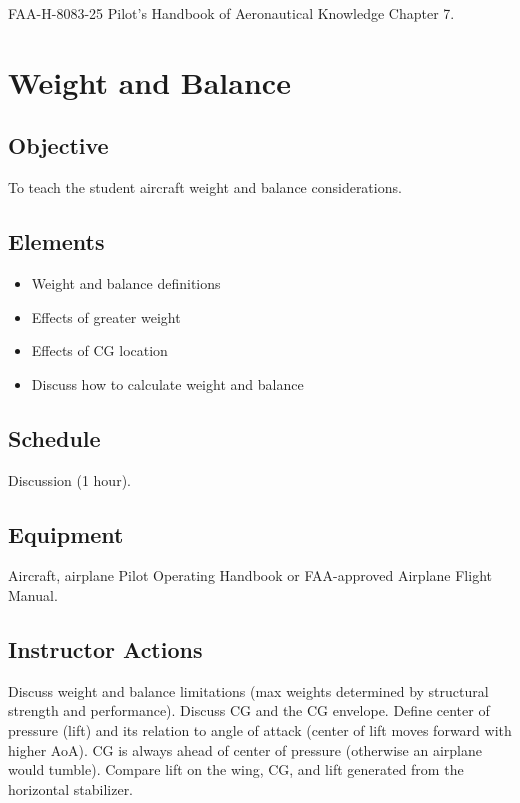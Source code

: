 \documentclass[twoside,openright]{report}
\begin{document}
FAA-H-8083-25 Pilot's Handbook of Aeronautical Knowledge Chapter 7.

\chapter{Weight and Balance}

\section{Objective}

To teach the student aircraft weight and balance considerations.

\section{Elements}

\begin{itemize}
  \item Weight and balance definitions
  \item Effects of greater weight
  \item Effects of CG location
  \item Discuss how to calculate weight and balance
\end{itemize}

\section{Schedule}

Discussion (1 hour).

\section{Equipment}

Aircraft, airplane Pilot Operating Handbook or FAA-approved Airplane Flight
Manual.

\section{Instructor Actions}

Discuss weight and balance limitations (max weights determined by structural
strength and performance). Discuss CG and the CG envelope. Define center of
pressure (lift) and its relation to angle of attack (center of lift moves
forward with higher AoA). CG is always ahead of center of pressure (otherwise
an airplane would tumble). Compare lift on the wing, CG, and lift generated
from the horizontal stabilizer.
\end{document}
